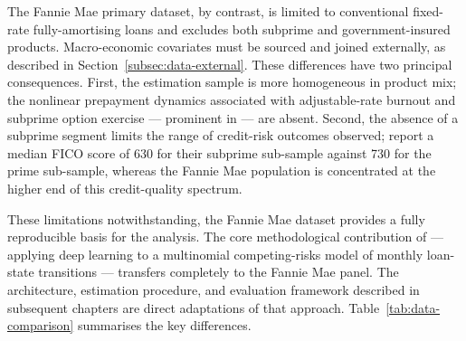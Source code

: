 The Fannie Mae primary dataset, by contrast, is limited to
conventional fixed-rate fully-amortising loans and excludes both
subprime and government-insured products.  Macro-economic covariates
must be sourced and joined externally, as described in
Section~\ref{subsec:data-external}.  These differences have two
principal consequences.  First, the estimation sample is more
homogeneous in product mix; the nonlinear prepayment dynamics
associated with adjustable-rate burnout and subprime option exercise
--- prominent in \citeauthor{sirignano2021} --- are absent.  Second,
the absence of a subprime segment limits the range of credit-risk
outcomes observed; \citet{sirignano2021} report a median FICO score
of 630 for their subprime sub-sample against 730 for the prime
sub-sample, whereas the Fannie Mae population is concentrated at the
higher end of this credit-quality spectrum.

These limitations notwithstanding, the Fannie Mae dataset provides a
fully reproducible basis for the analysis.  The core methodological
contribution of \citet{sirignano2021} --- applying deep learning to a
multinomial competing-risks model of monthly loan-state transitions
--- transfers completely to the Fannie Mae panel.  The architecture,
estimation procedure, and evaluation framework described in subsequent
chapters are direct adaptations of that approach.  Table~\ref{tab:data-comparison}
summarises the key differences.


